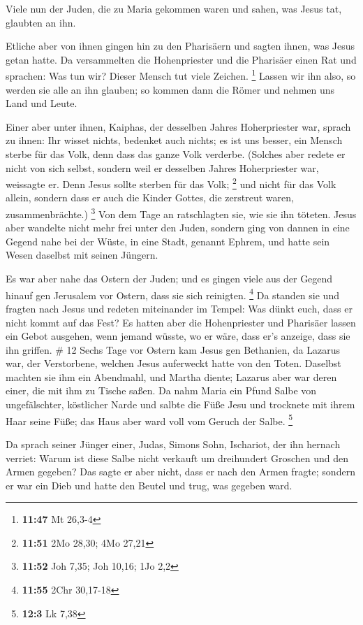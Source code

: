  Viele nun der Juden, die zu Maria gekommen waren und
sahen, was Jesus tat, glaubten an ihn.

 Etliche aber von ihnen gingen hin zu den Pharisäern und
sagten ihnen, was Jesus getan hatte.  Da versammelten die
Hohenpriester und die Pharisäer einen Rat und sprachen: Was tun wir?
Dieser Mensch tut viele Zeichen. \footnote{\textbf{11:47} Mt 26,3-4}
 Lassen wir ihn also, so werden sie alle an ihn glauben; so
kommen dann die Römer und nehmen uns Land und Leute.

 Einer aber unter ihnen, Kaiphas, der desselben Jahres
Hoherpriester war, sprach zu ihnen: Ihr wisset nichts, 
bedenket auch nichts; es ist uns besser, ein Mensch sterbe für das Volk,
denn dass das ganze Volk verderbe.  (Solches aber redete er
nicht von sich selbst, sondern weil er desselben Jahres Hoherpriester
war, weissagte er. Denn Jesus sollte sterben für das Volk; \footnote{\textbf{11:51}
  2Mo 28,30; 4Mo 27,21}  und nicht für das Volk allein,
sondern dass er auch die Kinder Gottes, die zerstreut waren,
zusammenbrächte.) \footnote{\textbf{11:52} Joh 7,35; Joh 10,16; 1Jo 2,2}
 Von dem Tage an ratschlagten sie, wie sie ihn töteten.
 Jesus aber wandelte nicht mehr frei unter den Juden,
sondern ging von dannen in eine Gegend nahe bei der Wüste, in eine
Stadt, genannt Ephrem, und hatte sein Wesen daselbst mit seinen Jüngern.

 Es war aber nahe das Ostern der Juden; und es gingen viele
aus der Gegend hinauf gen Jerusalem vor Ostern, dass sie sich reinigten.
\footnote{\textbf{11:55} 2Chr 30,17-18}  Da standen sie und
fragten nach Jesus und redeten miteinander im Tempel: Was dünkt euch,
dass er nicht kommt auf das Fest?  Es hatten aber die
Hohenpriester und Pharisäer lassen ein Gebot ausgehen, wenn jemand
wüsste, wo er wäre, dass er's anzeige, dass sie ihn griffen. \# 12
 Sechs Tage vor Ostern kam Jesus gen Bethanien, da Lazarus
war, der Verstorbene, welchen Jesus auferweckt hatte von den Toten.
 Daselbst machten sie ihm ein Abendmahl, und Martha diente;
Lazarus aber war deren einer, die mit ihm zu Tische saßen. 
Da nahm Maria ein Pfund Salbe von ungefälschter, köstlicher Narde und
salbte die Füße Jesu und trocknete mit ihrem Haar seine Füße; das Haus
aber ward voll vom Geruch der Salbe. \footnote{\textbf{12:3} Lk 7,38}

 Da sprach seiner Jünger einer, Judas, Simons Sohn,
Ischariot, der ihn hernach verriet:  Warum ist diese Salbe
nicht verkauft um dreihundert Groschen und den Armen gegeben?
 Das sagte er aber nicht, dass er nach den Armen fragte;
sondern er war ein Dieb und hatte den Beutel und trug, was gegeben ward.

